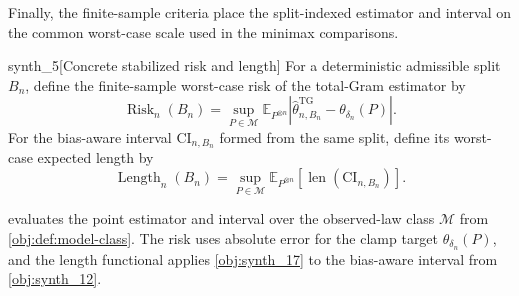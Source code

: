 Finally, the finite-sample criteria place the split-indexed estimator and interval on the common worst-case scale used in the minimax comparisons.

\begin{definitionv}{synth_5}[Concrete stabilized risk and length]
For a deterministic admissible split \(B_n\), define the finite-sample worst-case risk of the total-Gram estimator by
\[
  \operatorname{Risk}_n(B_n)=\sup_{P\in\mathcal M}
  \mathbb E_{P^{\otimes n}}\!\left|\widehat\theta_{n,B_n}^{\mathrm{TG}}-\theta_{\delta_n}(P)\right|.
\]
For the bias-aware interval \(\mathrm{CI}_{n,B_n}\) formed from the same split, define its worst-case expected length by
\[
  \operatorname{Length}_n(B_n)=\sup_{P\in\mathcal M}
  \mathbb E_{P^{\otimes n}}[\operatorname{len}(\mathrm{CI}_{n,B_n})].
\]
\end{definitionv}

 evaluates the point estimator and interval over the observed-law class \(\mathcal M\) from \cref{obj:def:model-class}. The risk uses absolute error for the clamp target \(\theta_{\delta_n}(P)\), and the length functional applies \cref{obj:synth_17} to the bias-aware interval from \cref{obj:synth_12}.
